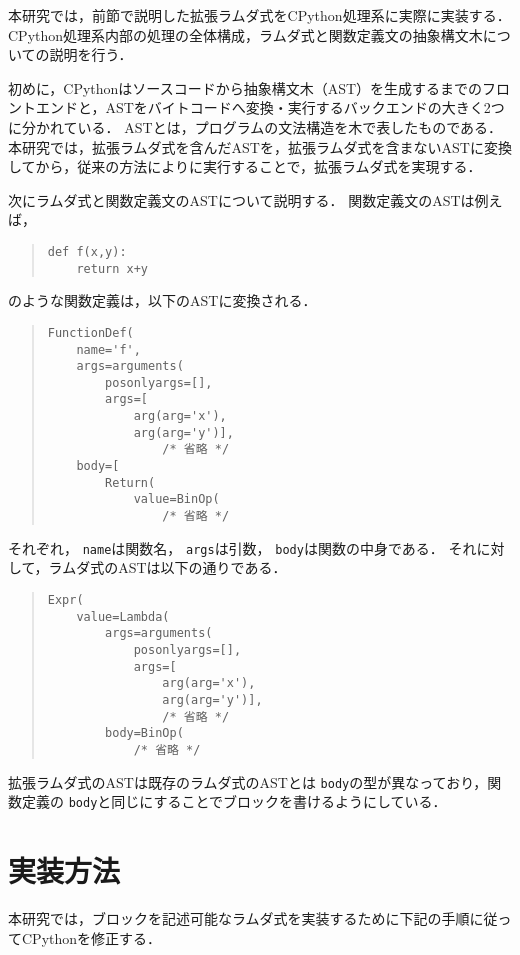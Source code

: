 \documentclass[twocolumn]{jsarticle}
\begin{document}
本研究では，前節で説明した拡張ラムダ式をCPython処理系に実際に実装する．CPython処理系内部の処理の全体構成，ラムダ式と関数定義文の抽象構文木についての説明を行う．

初めに，CPythonはソースコードから抽象構文木（AST）を生成するまでのフロントエンドと，ASTをバイトコードへ変換・実行するバックエンドの大きく2つに分かれている．
ASTとは，プログラムの文法構造を木で表したものである．
本研究では，拡張ラムダ式を含んだASTを，拡張ラムダ式を含まないASTに変換してから，従来の方法によりに実行することで，拡張ラムダ式を実現する．

次にラムダ式と関数定義文のASTについて説明する．
関数定義文のASTは例えば，
\begin{quote}
\setlength{\baselineskip}{12pt}
\begin{verbatim}
def f(x,y):
    return x+y
\end{verbatim}
\end{quote}
のような関数定義は，以下のASTに変換される．
\begin{quote}
\setlength{\baselineskip}{12pt}
\begin{verbatim}
FunctionDef(
    name='f',
    args=arguments(
        posonlyargs=[],
        args=[
            arg(arg='x'),
            arg(arg='y')],
                /* 省略 */
    body=[
        Return(
            value=BinOp(
                /* 省略 */
\end{verbatim}
\end{quote}
それぞれ， \texttt{name}は関数名， \texttt{args}は引数， \texttt{body}は関数の中身である．
それに対して，ラムダ式のASTは以下の通りである．
\begin{quote}
\setlength{\baselineskip}{12pt}
\begin{verbatim}
Expr(
    value=Lambda(
        args=arguments(
            posonlyargs=[],
            args=[
                arg(arg='x'),
                arg(arg='y')],
                /* 省略 */
        body=BinOp(
            /* 省略 */
\end{verbatim}
\end{quote}
拡張ラムダ式のASTは既存のラムダ式のASTとは \texttt{body}の型が異なっており，関数定義の \texttt{body}と同じにすることでブロックを書けるようにしている．

\section{実装方法}
本研究では，ブロックを記述可能なラムダ式を実装するために下記の手順に従ってCPythonを修正する．
\end{document}

